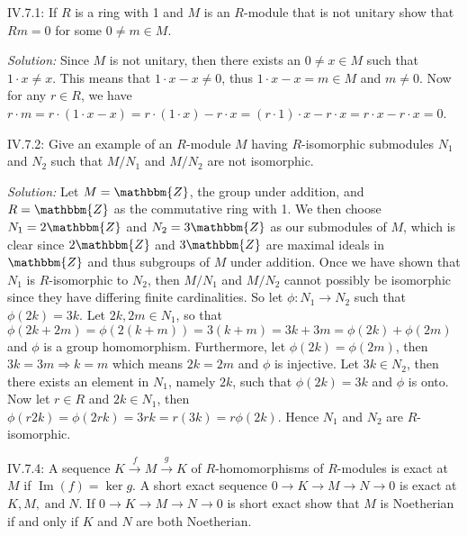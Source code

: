 \documentclass{letter}
\newcommand{\tmem}[1]{{\em #1\/}}
\newcommand{\tmop}[1]{\ensuremath{\operatorname{#1}}}
\begin{document}
IV.7.1: If $R$ is a ring with 1 and $M$ is an $R$-module that is not unitary
show that $R m = 0$ for some $0 \neq m \in M$.

{\tmem{Solution:}} Since $M$ is not unitary, then there exists an $0 \neq x
\in M$ such that $1 \cdot x \neq x$. This means that $1 \cdot x - x \neq 0$,
thus $1 \cdot x - x = m \in M$ and $m \neq 0$. Now for any $r \in R$, we have
$r \cdot m = r \cdot (1 \cdot x - x) = r \cdot (1 \cdot x) - r \cdot x = (r
\cdot 1) \cdot x - r \cdot x = r \cdot x - r \cdot x = 0$.

IV.7.2: Give an example of an $R$-module $M$ having $R$-isomorphic submodules
$N_1$ and $N_2$ such that $M / N_1$ and $M / N_2$ are not isomorphic.

{\tmem{Solution:}} Let $M =\mathbbm{Z}$, the group under addition, and $R
=\mathbbm{Z}$ as the commutative ring with 1. We then choose $N_1 =
2\mathbbm{Z}$ and $N_2 = 3\mathbbm{Z}$ as our submodules of $M$, which is
clear since $2\mathbbm{Z}$ and $3\mathbbm{Z}$ are maximal ideals in
$\mathbbm{Z}$ and thus subgroups of $M$ under addition. Once we have shown
that $N_1$ is $R$-isomorphic to $N_2$, then $M / N_1$ and $M / N_2$ cannot
possibly be isomorphic since they have differing finite cardinalities. So let
$\phi : N_1 \rightarrow N_2$ such that $\phi (2 k) = 3 k$. Let $2 k, 2 m \in
N_1$, so that $\phi (2 k + 2 m) = \phi (2 (k + m)) = 3 (k + m) = 3 k + 3 m =
\phi (2 k) + \phi (2 m)$ and $\phi$ is a group homomorphism. Furthermore, let
$\phi (2 k) = \phi (2 m)$, then $3 k = 3 m \Rightarrow k = m$ which means $2 k
= 2 m$ and $\phi$ is injective. Let $3 k \in N_2$, then there exists an
element in $N_1$, namely $2 k$, such that $\phi (2 k) = 3 k$ and $\phi$ is
onto. Now let $r \in R$ and $2 k \in N_1$, then $\phi (r 2 k) = \phi (2 r k) =
3 r k = r (3 k) = r \phi (2 k)$. Hence $N_1$ and $N_2$ are $R$-isomorphic.

IV.7.4: A sequence $K \overset{f}{\rightarrow} M \overset{g}{\rightarrow} K$
of $R$-homomorphisms of $R$-modules is exact at $M$ if $\tmop{Im} (f) = \ker
g$. A short exact sequence $0 \rightarrow K \rightarrow M \rightarrow N
\rightarrow 0$ is exact at $K, M, \tmop{and} N$. If $0 \rightarrow K
\rightarrow M \rightarrow N \rightarrow 0$ is short exact show that $M$ is
Noetherian if and only if $K$ and $N$ are both Noetherian.
\end{document}
